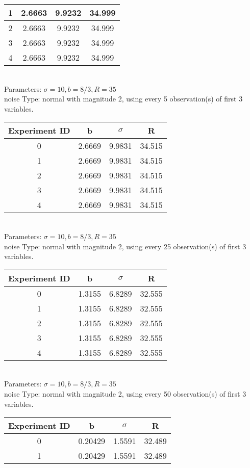 \begin{multicols}{3}
\begin{tabular}{cccc}
 1 & 2.6663 & 9.9232 & 34.999\\ \hline 
 2 & 2.6663 & 9.9232 & 34.999\\ \hline 
 3 & 2.6663 & 9.9232 & 34.999\\ \hline 
 4 & 2.6663 & 9.9232 & 34.999\\ \hline 
 \end{tabular}\\
Parameters: $\sigma=10, b=8/3, R=35$\\
noise Type: normal with magnitude 2, using every 5 observation(s) of first 3 variables.\\
\begin{tabular}{cccc}
\hline Experiment ID & b & $\sigma$ & R \\ \hline 
0 & 2.6669 & 9.9831 & 34.515\\ \hline 
 1 & 2.6669 & 9.9831 & 34.515\\ \hline 
 2 & 2.6669 & 9.9831 & 34.515\\ \hline 
 3 & 2.6669 & 9.9831 & 34.515\\ \hline 
 4 & 2.6669 & 9.9831 & 34.515\\ \hline 
 \end{tabular}\\
Parameters: $\sigma=10, b=8/3, R=35$\\
noise Type: normal with magnitude 2, using every 25 observation(s) of first 3 variables.\\
\begin{tabular}{cccc}
\hline Experiment ID & b & $\sigma$ & R \\ \hline 
0 & 1.3155 & 6.8289 & 32.555\\ \hline 
 1 & 1.3155 & 6.8289 & 32.555\\ \hline 
 2 & 1.3155 & 6.8289 & 32.555\\ \hline 
 3 & 1.3155 & 6.8289 & 32.555\\ \hline 
 4 & 1.3155 & 6.8289 & 32.555\\ \hline 
 \end{tabular}\\
Parameters: $\sigma=10, b=8/3, R=35$\\
noise Type: normal with magnitude 2, using every 50 observation(s) of first 3 variables.\\
\begin{tabular}{cccc}
\hline Experiment ID & b & $\sigma$ & R \\ \hline 
0 & 0.20429 & 1.5591 & 32.489\\ \hline 
 1 & 0.20429 & 1.5591 & 32.489\\ \hline 

\end{tabular}
\end{multicols}
